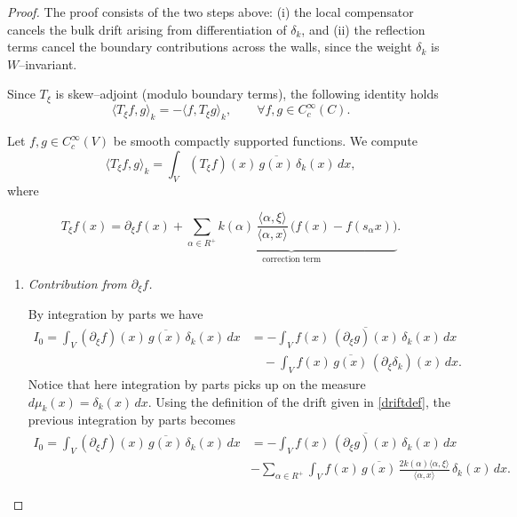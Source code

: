 \documentclass[12pt]{article}
\newcommand{\1}{\mathbbm{1}}
\theoremstyle{definition}
\begin{document}
\begin{proof}

The proof consists of the two steps above: (i) the local compensator cancels the bulk drift
arising from differentiation of $\delta_{k}$, and (ii) the reflection terms cancel the
boundary contributions across the walls, since the weight $\delta_{k}$ is $W$--invariant.


Since $T_{\xi}$ is  skew--adjoint (modulo boundary terms), the following identity holds
\[
  \langle T_{\xi} f, g \rangle_{k}
  = - \langle f, T_{\xi} g \rangle_{k}, \qquad
  \forall f,g \in C_{c}^{\infty}(C).
\]


Let $f,g \in C_c^\infty(V)$ be smooth compactly supported functions. We compute
\[
  \langle T_\xi f, g \rangle_k
  = \int_V (T_\xi f)(x)\,\overline{g(x)}\,\delta_k(x)\,dx,
\]
where

\begin{equation}\label{secondterm}
  T_\xi f(x)
  = \partial_\xi f(x)
    + \underbrace{
        \sum_{\alpha \in R^+} k(\alpha)\,\frac{\langle \alpha,\xi\rangle}{\langle \alpha,x\rangle}\,
        \big( f(x) - f(s_\alpha x)\big)
      }_{\text{correction term}} .
\end{equation}

\begin{enumerate}

\item \textsl{Contribution from $\partial_\xi f$.}  


By integration by parts we have
\begin{align*}
I_0=\int_V (\partial_\xi f)(x)\,\overline{g(x)}\,\delta_k(x)\,dx
&= - \int_V f(x)\,\overline{(\partial_\xi g)(x)}\,\delta_k(x)\,dx \\
&\quad - \int_V f(x)\,\overline{g(x)}\,(\partial_\xi \delta_k)(x)\,dx.
\end{align*}
Notice that here integration by parts picks up on the measure $d\mu_k(x) = \delta_k(x)\,dx.$ Using the definition of the drift given in \eqref{driftdef}, the previous integration by parts becomes
\begin{align}\label{eq:adjoint-derivative}
I_0=\int_V (\partial_\xi f)(x)\,\overline{g(x)}\,\delta_k(x)\,dx
&= - \int_V f(x)\,\overline{(\partial_\xi g)(x)}\,\delta_k(x)\,dx \nonumber\\
 & - \sum_{\alpha \in R^+}\int_V
    f(x)\,\overline{g(x)}\,\frac{2k(\alpha)\langle \alpha,\xi\rangle}{\langle \alpha,x\rangle}\,\delta_k(x)\,dx.
\end{align}



\end{enumerate}
\end{proof}
\end{document}
